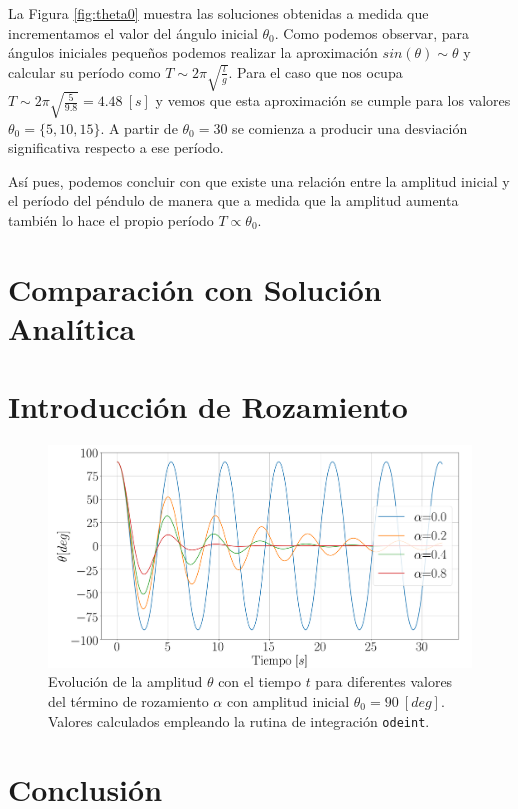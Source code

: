 \documentclass[journal]{IEEEtran}
\begin{document}
La Figura \ref{fig:theta0} muestra las soluciones obtenidas a medida que incrementamos el valor del ángulo inicial $\theta_0$. Como podemos observar, para ángulos iniciales pequeños podemos realizar la aproximación $sin(\theta) \sim \theta$ y calcular su período como $T \sim 2\pi\sqrt{\frac{l}{g}}$. Para el caso que nos ocupa $T \sim 2\pi\sqrt{\frac{5}{9.8}} = 4.48~[s]$ y vemos que esta aproximación se cumple para los valores $\theta_0 = \{5, 10,
15\}$. A partir de $\theta_0 = 30$ se comienza a producir una desviación significativa respecto a ese período.

Así pues, podemos concluir con que existe una relación entre la amplitud inicial y el período del péndulo de manera que a medida que la amplitud aumenta también lo hace el propio período $T\propto \theta_0$.

\section{Comparación con Solución Analítica}

\section{Introducción de Rozamiento}

\begin{figure}[!htb]
  \centering
  \includegraphics[width=\linewidth]{alpha}
  \caption{Evolución de la amplitud $\theta$ con el tiempo $t$ para diferentes valores del término de rozamiento $\alpha$ con amplitud inicial $\theta_0=90~[deg]$. Valores calculados empleando la rutina de integración \texttt{odeint}.}
  \label{fig:alpha}
\end{figure}

\section{Conclusión}
\end{document}
